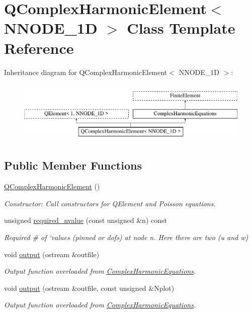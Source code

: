 \hypertarget{classQComplexHarmonicElement}{}\section{Q\+Complex\+Harmonic\+Element$<$ N\+N\+O\+D\+E\+\_\+1D $>$ Class Template Reference}
\label{classQComplexHarmonicElement}
Inheritance diagram for Q\+Complex\+Harmonic\+Element$<$ N\+N\+O\+D\+E\+\_\+1D $>$\+:\begin{figure}[H]
\begin{center}
\leavevmode
\includegraphics[height=3.000000cm]{classQComplexHarmonicElement}
\end{center}
\end{figure}
\subsection*{Public Member Functions}
\begin{DoxyCompactItemize}
\item 
\hyperlink{classQComplexHarmonicElement_a9f1e88c4b5c7031d77c6f6dd3758de2a}{Q\+Complex\+Harmonic\+Element} ()
\begin{DoxyCompactList}\small\item\em Constructor\+: Call constructors for Q\+Element and Poisson equations. \end{DoxyCompactList}\item 
unsigned \hyperlink{classQComplexHarmonicElement_a3f1d68324e9d8b9e143044d716c72a87}{required\+\_\+nvalue} (const unsigned \&n) const
\begin{DoxyCompactList}\small\item\em Required \# of `values\textquotesingle{} (pinned or dofs) at node n. Here there are two (u and w) \end{DoxyCompactList}\item 
void \hyperlink{classQComplexHarmonicElement_a8c45d7281a7bc7e2e2d53a7f87339ca4}{output} (ostream \&outfile)
\begin{DoxyCompactList}\small\item\em Output function overloaded from \hyperlink{classComplexHarmonicEquations}{Complex\+Harmonic\+Equations}. \end{DoxyCompactList}\item 
void \hyperlink{classQComplexHarmonicElement_a7f63f8532a6295a3ba86f94355f889b8}{output} (ostream \&outfile, const unsigned \&Nplot)
\begin{DoxyCompactList}\small\item\em Output function overloaded from \hyperlink{classComplexHarmonicEquations}{Complex\+Harmonic\+Equations}. \end{DoxyCompactList}\end{DoxyCompactItemize}

